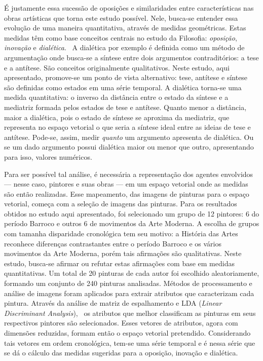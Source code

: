 É justamente essa sucessão de oposições e similaridades entre
características nas obras artísticas que torna este estudo
possível. Nele, busca-se entender essa evolução de uma maneira
quantitativa, através de medidas geométricas. Estas medidas têm como
base conceitos centrais no estudo da Filosofia: \textit{oposição},
\textit{inovação} e \textit{dialética}.~\cite{deleuze,pinto,van} A
dialética por exemplo é definida como um método de argumentação onde
busca-se a síntese entre dois argumentos contraditórios: a tese e a
antítese. São conceitos originalmente qualitativos. Neste estudo, aqui apresentado, promove-se um ponto de vista alternativo: tese,
antítese e síntese são definidas como estados em uma série temporal. A dialética torna-se uma
medida quantitativa: o inverso da distância entre o estado da síntese e
a mediatriz formada pelos estados de tese e antítese. Quanto menor a
distância, maior a dialética, pois o estado de síntese se aproxima da
mediatriz, que representa no espaço vetorial o que seria a síntese ideal
entre as ideias de tese e antítese. Pode-se, assim, medir
\emph{quanto} um argumento apresenta de dialética. Ou se um dado
argumento possui dialética maior ou menor que outro, apresentando para
isso, valores numéricos.

Para ser possível tal análise, é necessária a representação dos
agentes envolvidos --- nesse caso, pintores e suas obras --- em um
espaço vetorial onde as medidas são então realizadas. Esse mapeamento,
das imagens de pinturas para o espaço vetorial, começa com a seleção
de imagens das pinturas. Para os resultados obtidos no estudo aqui
apresentado, foi selecionado um grupo de 12 pintores: 6 do período
Barroco e outros 6 de movimentos da Arte Moderna. A escolha de grupos
com tamanha disparidade cronológica tem seu motivo: a História das
Artes reconhece diferenças contrastantes entre o período Barroco e os
vários movimentos da Arte Moderna, porém tais afirmações são
qualitativas. Neste estudo, busca-se afirmar ou refutar estas
afirmações com base em medidas quantitativas. Um total de 20 pinturas
de cada autor foi escolhido aleatoriamente, formando um conjunto de 240
pinturas analisadas. Métodos de processamento e análise de
imagens foram aplicados para extrair atributos que caracterizam cada
pintura. Através da análise de matriz de espalhamento e LDA (\textit{Linear
Discriminant Analysis}),~\cite{luciano,fisher} os atributos que melhor
classificam as pinturas em seus respectivos pintores são
selecionados. Esses vetores de atributos, agora com dimensões
reduzidas, formam então o espaço vetorial pretendido. Considerando
tais vetores em ordem cronológica, tem-se uma série temporal e é nessa
série que se dá o cálculo das medidas sugeridas para a oposição,
inovação e dialética.

